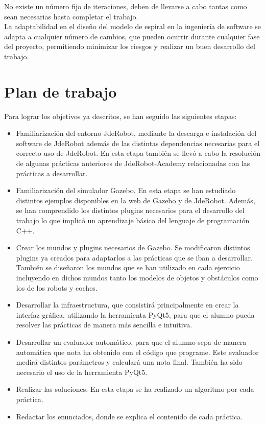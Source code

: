 No existe un número fijo de iteraciones, deben de llevarse a cabo tantas como sean necesarias hasta completar el trabajo. \\

La adaptabilidad en el diseño del modelo de espiral en la ingeniería de software se adapta a cualquier número de cambios, que pueden ocurrir durante cualquier fase del proyecto, permitiendo minimizar los riesgos y realizar un buen desarrollo del trabajo.

\section{Plan de trabajo}

Para lograr los objetivos ya descritos, se han seguido las siguientes etapas:
\begin{itemize}
	\item Familiarización del entorno JdeRobot, mediante la descarga e instalación del software de JdeRobot además de las distintas dependencias necesarias para el correcto uso de JdeRobot. En esta etapa también se llevó a cabo la resolución de algunas prácticas anteriores de JdeRobot-Academy relacionadas con las prácticas a desarrollar.

	\item Familiarización del simulador Gazebo. En esta etapa se han estudiado distintos ejemplos disponibles en la web de Gazebo y de JdeRobot. Además, se han comprendido los distintos plugins necesarios para el desarrollo del trabajo lo que implicó un aprendizaje básico del lenguaje de programación C++.

	\item Crear los mundos y plugins necesarios de Gazebo.  Se modificaron distintos plugins ya creados para adaptarlos a las prácticas que se iban a desarrollar. También se diseñaron los mundos que se han utilizado en cada ejercicio incluyendo en dichos mundos tanto los modelos de objetos y obstáculos como los de los robots y coches.

	\item Desarrollar la infraestructura, que consistirá principalmente en crear la interfaz gráfica, utilizando la herramienta PyQt5, para que el alumno pueda resolver las prácticas de manera más sencilla e intuitiva.

	\item Desarrollar un evaluador automático, para que el alumno sepa de manera automática que nota ha obtenido con el código que programe. Este evaluador medirá distintos parámetros y calculará una nota final. También ha sido necesario el uso de la herramienta PyQt5.

	\item Realizar las soluciones. En esta etapa se ha realizado un algoritmo por cada práctica.

	\item Redactar los enunciados, donde se explica el contenido de cada práctica.
\end{itemize}

